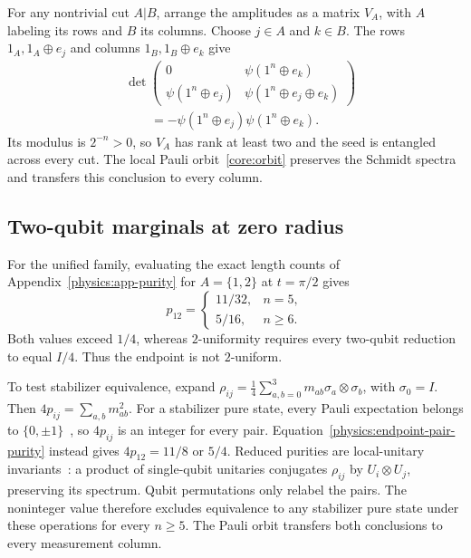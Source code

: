 For any nontrivial cut $A|B$, arrange the amplitudes as a matrix $V_A$, with $A$ labeling its rows and $B$ its columns. Choose $j\in A$ and $k\in B$. The rows $1_A,1_A\oplus e_j$ and columns $1_B,1_B\oplus e_k$ give
\[
 \begin{aligned}
 &\det\begin{pmatrix}
 0&\psi(1^n\oplus e_k)\\
 \psi(1^n\oplus e_j)&\psi(1^n\oplus e_j\oplus e_k)
 \end{pmatrix}\\
 &\qquad=-\psi(1^n\oplus e_j)\psi(1^n\oplus e_k).
 \end{aligned}
\]
Its modulus is $2^{-n}>0$, so $V_A$ has rank at least two and the seed is entangled across every cut. The local Pauli orbit~\eqref{core:orbit} preserves the Schmidt spectra and transfers this conclusion to every column.

\subsection{Two-qubit marginals at zero radius}
\label{physics:app-invariants}

For the unified family, evaluating the exact length counts of Appendix~\ref{physics:app-purity} for $A=\{1,2\}$ at $t=\pi/2$ gives
\begin{equation}
 p_{12}=\begin{cases}11/32,&n=5,\\5/16,&n\ge6.\end{cases}
 \label{physics:endpoint-pair-purity}
\end{equation}
Both values exceed $1/4$, whereas $2$-uniformity requires every two-qubit reduction to equal $I/4$. Thus the endpoint is not $2$-uniform.

To test stabilizer equivalence, expand $\rho_{ij}=\tfrac14\sum_{a,b=0}^3m_{ab}\sigma_a\otimes\sigma_b$, with $\sigma_0=I$. Then $4p_{ij}=\sum_{a,b}m_{ab}^2$. For a stabilizer pure state, every Pauli expectation belongs to $\{0,\pm1\}$~\cite{Gottesman1997}, so $4p_{ij}$ is an integer for every pair. Equation~\eqref{physics:endpoint-pair-purity} instead gives $4p_{12}=11/8$ or $5/4$. Reduced purities are local-unitary invariants~\cite{Grassl1998}: a product of single-qubit unitaries conjugates $\rho_{ij}$ by $U_i\otimes U_j$, preserving its spectrum. Qubit permutations only relabel the pairs. The noninteger value therefore excludes equivalence to any stabilizer pure state under these operations for every $n\ge5$. The Pauli orbit transfers both conclusions to every measurement column.

